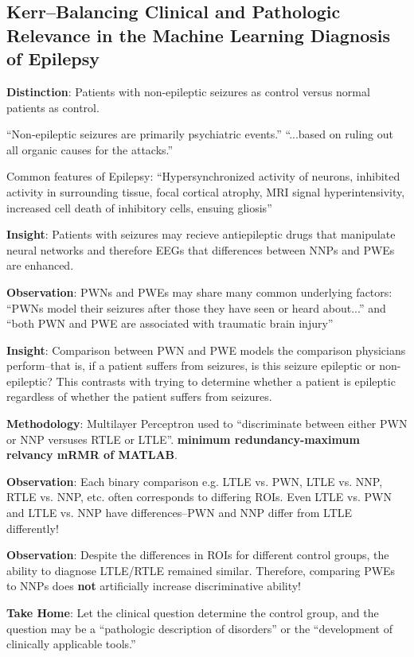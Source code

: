\documentclass{article}
\begin{document}
\subsection{Kerr--Balancing Clinical and Pathologic Relevance in the Machine Learning
Diagnosis of Epilepsy}
\textbf{Distinction}: Patients with non-epileptic seizures as control versus
normal patients as control.

``Non-epileptic seizures are primarily psychiatric events.'' ``...based on
ruling out all organic causes for the attacks.''


Common features of Epilepsy: ``Hypersynchronized activity of neurons, inhibited
activity in surrounding tissue, focal cortical atrophy, MRI signal
hyperintensivity, increased cell death of inhibitory cells, ensuing gliosis''

\textbf{Insight}: Patients with seizures may recieve antiepileptic drugs that manipulate
neural networks and therefore EEGs that differences between NNPs and PWEs are
enhanced.

\textbf{Observation}: PWNs and PWEs may share many common underlying factors: ``PWNs
model their seizures after those they have seen or heard about...'' and ``both
PWN and PWE are associated with traumatic brain injury''

\textbf{Insight}: Comparison between PWN and PWE models the comparison physicians
perform--that is, if a patient suffers from seizures, is this seizure epileptic
or non-epileptic? This contrasts with trying to determine whether a patient is
epileptic regardless of whether the patient suffers from seizures.

\textbf{Methodology}: Multilayer Perceptron used to ``discriminate between either PWN or
NNP versuses RTLE or LTLE''. \textbf{minimum redundancy-maximum relvancy mRMR of
MATLAB}.

\textbf{Observation}: Each binary comparison e.g. LTLE vs. PWN, LTLE vs. NNP, RTLE vs.
NNP, etc. often corresponds to differing ROIs. Even LTLE vs. PWN and LTLE vs.
NNP have differences--PWN and NNP differ from LTLE differently!

\textbf{Observation}: Despite the differences in ROIs for different control
groups, the ability to diagnose LTLE/RTLE remained similar. Therefore,
comparing PWEs to NNPs does \textbf{not} artificially increase discriminative
ability!

\textbf{Take Home}: Let the clinical question determine the control group, and
the question may be a ``pathologic description of disorders'' or the
``development of clinically applicable tools.''  
\end{document}
